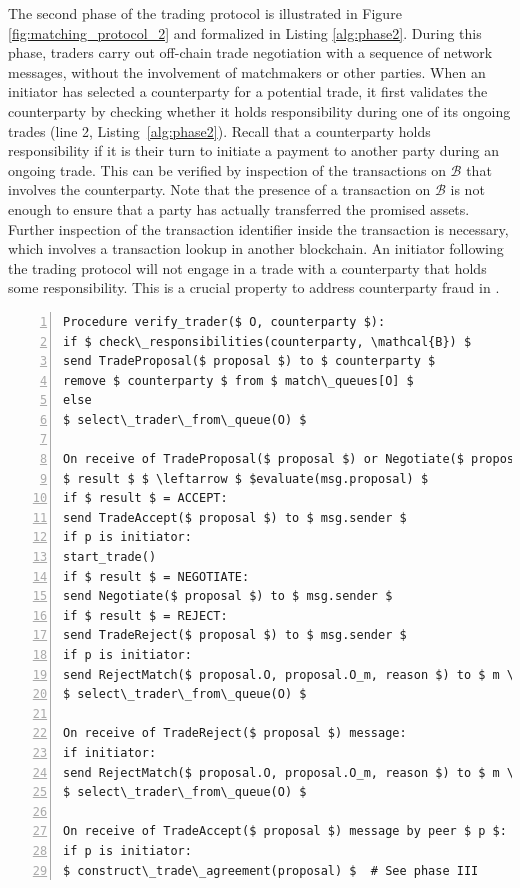 The second phase of the \ModelName{} trading protocol is illustrated in Figure \ref{fig:matching_protocol_2} and formalized in Listing \ref{alg:phase2}.
During this phase, traders carry out off-chain trade negotiation with a sequence of network messages, without the involvement of matchmakers or other parties.
When an initiator has selected a counterparty for a potential trade, it first validates the counterparty by checking whether it holds responsibility during one of its ongoing trades (line 2, Listing~\ref{alg:phase2}).
Recall that a counterparty holds responsibility if it is their turn to initiate a payment to another party during an ongoing trade.
This can be verified by inspection of the transactions on $ \mathcal{B} $ that involves the counterparty.
Note that the presence of a \TRPayment{} transaction on $ \mathcal{B} $ is not enough to ensure that a party has actually transferred the promised assets.
Further inspection of the transaction identifier inside the \TRPayment{} transaction is necessary, which involves a transaction lookup in another blockchain.
An initiator following the \ModelName{} trading protocol will not engage in a trade with a counterparty that holds some responsibility.
This is a crucial property to address counterparty fraud in \ModelName{}.

\begin{lstlisting}[firstnumber=1,caption={Phase II: Trade negotiation.},label={alg:phase2},captionpos=b,float=t,numbers=left,tabsize=2, basicstyle=\footnotesize\ttfamily, mathescape=true, emph={while, if, then, do, Procedure, record, send, receive, in, foreach, ignore, else},emphstyle=\bf, frame=TB]
Procedure verify_trader($ O, counterparty $):
if $ check\_responsibilities(counterparty, \mathcal{B}) $
send TradeProposal($ proposal $) to $ counterparty $
remove $ counterparty $ from $ match\_queues[O] $
else
$ select\_trader\_from\_queue(O) $

On receive of TradeProposal($ proposal $) or Negotiate($ proposal $) message by peer $ p $:
$ result $ $ \leftarrow $ $evaluate(msg.proposal) $
if $ result $ = ACCEPT:
send TradeAccept($ proposal $) to $ msg.sender $
if p is initiator:
start_trade()
if $ result $ = NEGOTIATE:
send Negotiate($ proposal $) to $ msg.sender $
if $ result $ = REJECT:
send TradeReject($ proposal $) to $ msg.sender $
if p is initiator:
send RejectMatch($ proposal.O, proposal.O_m, reason $) to $ m \subseteq \mathcal{M} $
$ select\_trader\_from\_queue(O) $

On receive of TradeReject($ proposal $) message:
if initiator:
send RejectMatch($ proposal.O, proposal.O_m, reason $) to $ m \subseteq \mathcal{M} $
$ select\_trader\_from\_queue(O) $

On receive of TradeAccept($ proposal $) message by peer $ p $:
if p is initiator:
$ construct\_trade\_agreement(proposal)	$  # See phase III
\end{lstlisting}

